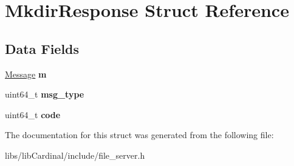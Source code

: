 \hypertarget{structMkdirResponse}{}\section{Mkdir\+Response Struct Reference}
\label{structMkdirResponse}
\subsection*{Data Fields}
\begin{DoxyCompactItemize}
\item 
\hyperlink{structMessage}{Message} {\bfseries m}\hypertarget{structMkdirResponse_ad21b2bd2198acb64d2ce8121a5f97a68}{}\label{structMkdirResponse_ad21b2bd2198acb64d2ce8121a5f97a68}

\item 
uint64\+\_\+t {\bfseries msg\+\_\+type}\hypertarget{structMkdirResponse_ab4ff9c1e347c410005af35670f97d023}{}\label{structMkdirResponse_ab4ff9c1e347c410005af35670f97d023}

\item 
uint64\+\_\+t {\bfseries code}\hypertarget{structMkdirResponse_afb335f98a0eeed827363dd409aaf499a}{}\label{structMkdirResponse_afb335f98a0eeed827363dd409aaf499a}

\end{DoxyCompactItemize}


The documentation for this struct was generated from the following file\+:\begin{DoxyCompactItemize}
\item 
libs/lib\+Cardinal/include/file\+\_\+server.\+h\end{DoxyCompactItemize}
